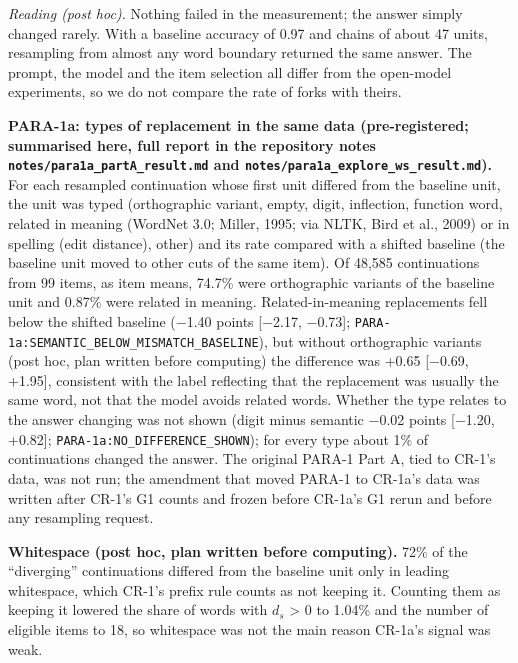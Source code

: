 \documentclass[
  10pt,
  a4paper,
]{article}
\begin{document}
\emph{Reading (post hoc).} Nothing failed in the measurement; the answer simply changed rarely. With a baseline accuracy of 0.97 and chains of about 47 units, resampling from almost any word boundary
returned the same answer. The prompt, the model and the item selection all differ from the open-model experiments, so we do not compare the rate of forks with theirs.

\textbf{PARA-1a: types of replacement in the same data (pre-registered; summarised here, full report in the repository notes \texttt{notes/para1a\_\allowbreak{}partA\_\allowbreak{}result.md} and
\texttt{notes/para1a\_\allowbreak{}explore\_\allowbreak{}ws\_\allowbreak{}result.md}).} For each resampled continuation whose first unit differed from the baseline unit, the unit was typed (orthographic variant, empty, digit, inflection,
function word, related in meaning (WordNet 3.0; Miller, 1995; via NLTK, Bird et al., 2009) or in spelling (edit distance), other) and its rate compared with a shifted baseline (the baseline unit moved
to other cuts of the same item). Of 48,585 continuations from 99 items, as item means, 74.7\% were orthographic variants of the baseline unit and 0.87\% were related in meaning. Related-in-meaning
replacements fell below the shifted baseline (−1.40 points {[}−2.17, −0.73{]}; \texttt{PARA-1a:SEMANTIC\_\allowbreak{}BELOW\_\allowbreak{}MISMATCH\_\allowbreak{}BASELINE}), but without orthographic variants (post hoc, plan written before
computing) the difference was +0.65 {[}−0.69, +1.95{]}, consistent with the label reflecting that the replacement was usually the same word, not that the model avoids related words. Whether the type
relates to the answer changing was not shown (digit minus semantic −0.02 points {[}−1.20, +0.82{]}; \texttt{PARA-1a:NO\_\allowbreak{}DIFFERENCE\_\allowbreak{}SHOWN}); for every type about 1\% of continuations changed the
answer. The original PARA-1 Part A, tied to CR-1's data, was not run; the amendment that moved PARA-1 to CR-1a's data was written after CR-1's G1 counts and frozen before CR-1a's G1 rerun and before
any resampling request.

\textbf{Whitespace (post hoc, plan written before computing).} 72\% of the ``diverging'' continuations differed from the baseline unit only in leading whitespace, which CR-1's prefix rule counts as
not keeping it. Counting them as keeping it lowered the share of words with \(d_{s}\) \textgreater{} 0 to 1.04\% and the number of eligible items to 18, so whitespace was not the main reason CR-1a's
signal was weak.
\end{document}
